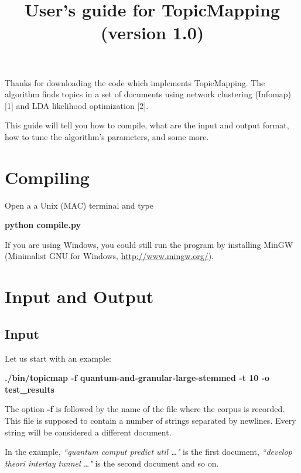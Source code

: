 \documentclass[11pt]{article}
\title{User's guide for TopicMapping (version 1.0)}
\begin{document}
\maketitle



Thanks for downloading the code which implements TopicMapping.
The algorithm finds topics in a set of documents using network clustering (Infomap) [1] 
and  LDA likelihood optimization [2]. 


This guide will tell you how to compile, what are the input and output format,
how to tune the algorithm's parameters, and some more.



\tableofcontents

\newpage

\section{Compiling}


Open  a a Unix (MAC) terminal and type  

\textbf{python compile.py}

If you are using Windows, you could still run
the program by installing MinGW
(Minimalist GNU for Windows, \url{http://www.mingw.org/}).


\section{Input and Output}

\subsection{Input}
Let us start with an example:

\textbf{./bin/topicmap -f quantum-and-granular-large-stemmed -t 10 -o test\_results}

The option \textbf{-f} is followed by the name of the file where the corpus is recorded. This file is supposed 
to contain a number of strings separated by newlines. Every string will be considered a different document.

In the example, 
\textit{``quantum comput predict util  \dots"}
is the first document, 
\textit{``develop theori interlay tunnel \dots"}
is the second document and so on.
\end{document}
